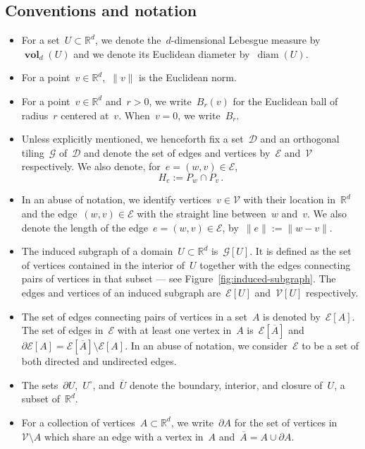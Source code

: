 \documentclass[12pt]{amsart}
\numberwithin{equation}{section}
\DeclareMathOperator{\diam}{{\mathop{diam}}}
\newcommand*{\Rd}{\ensuremath{\mathbb{R}^d}}
\newcommand{\G}{\mathcal{G}}
\newcommand{\V}{\mathcal{V}}
\newcommand{\E}{\mathcal{E}}
\DeclareMathOperator{\vol}{\mathbf{vol}}
\begin{document}
\subsection*{Conventions and notation}
\begin{itemize}
	\item For a set~$U \subset \Rd$, we denote the~$d$-dimensional Lebesgue measure by $\vol_{d}(U)$
	and we denote its Euclidean diameter by~$\diam(U)$.
	\item For a point~$v \in \Rd$,~$\|v\|$ is the Euclidean norm.
	\item For a point~$v \in \Rd$ and~$r > 0$, we write~$B_r(v)$ for the Euclidean ball of radius~$r$ centered at~$v$. When~$v=0$, we write~$B_r$. 
	\item Unless explicitly mentioned, we henceforth fix a set~$\mathcal{D}$ and an orthogonal tiling~$\G$ of~$\mathcal{D}$ and denote the set of edges and vertices by~$\E$ and~$\V$ respectively. 
	We also denote, for~$e = (w,v) \in \E$, 
	\[
	H_e := P_w \cap P_v \, . 
	\]
	\item In an abuse of notation, we identify vertices~$v \in \V$
	with their location in~$\Rd$ and the edge~$(w,v) \in \E$ with 
	the straight line between~$w$ and~$v$. We also denote the length of the edge~$e = (w,v) \in \E$, by~$\|e\| := \|w - v\|$. 
	
	
	\item 
	The induced subgraph of a domain~$U \subset \Rd$ is~$\G[U]$. It is defined as the set of vertices contained in the interior of~$U$ 
	together with the edges connecting pairs of vertices in that subset --- see Figure~\ref{fig:induced-subgraph}. The edges and vertices of an induced subgraph are~$\E[U]$ and~$\V[U]$ respectively. 
	
	\item The set of edges connecting pairs of vertices in a set~$A$ is denoted by~$\E[A]$. 
	The set of edges in~$\E$ with at least one vertex in~$A$ is~$\E[\overline{A}]$ and~$\partial \E[A] = \E[\overline{A}] \setminus \E[A]$.
	In an abuse of notation, we consider~$\E$ to be a set of both directed and undirected edges. 
	
	
	\item 
	The sets~$\partial U$,~$U^{\circ}$, and~$\overline U$ denote the boundary, interior, and closure of~$U$, a subset of~$\Rd$. 
	\item For a collection of vertices~$A \subset \Rd$, we write~$\partial A$ for the set of vertices in~$\V \setminus A$ which share an edge with a vertex in~$A$
	and~$\overline A = A \cup \partial A$. 
	

\end{itemize}
\end{document}
